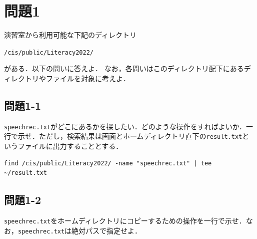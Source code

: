 \documentclass[10pt,dvipdfmx]{jsarticle}
\title{\framebox{\hspace{4zw}2022年度コンピュータリテラシ定期試験%
                 \hspace{4zw}}}
\author{\氏名 \\
        \学籍番号 \\
        愛知県立大学 情報科学部 情報科学科}
\date{2022年8月3日}
\newcommand{\answer}[1]{\begin{flushleft}
            \framebox{\large\bf #1}\end{flushleft}}
\newcommand{\氏名}{神野　友哉}  %
\newcommand{\学籍番号}{2022311042}  %
\begin{document}
\maketitle
%
%
%
%
%
\section*{問題1}

演習室から利用可能な下記のディレクトリ
\begin{center}
\texttt{/cis/public/Literacy2022/}
\end{center}
がある．以下の問いに答えよ．
なお，各問いはこのディレクトリ配下にあるディレクトリやファイルを対象に考えよ．




%
%
\subsection*{問題1-1}
\texttt{speechrec.txt}がどこにあるかを探したい．どのような操作をすればよいか．一行で示せ．ただし，検索結果は画面とホームディレクトリ直下の\texttt{result.txt}というファイルに出力することとする．


\answer{解答1-1}
\begin{verbatim}
find /cis/public/Literacy2022/ -name "speechrec.txt" | tee ~/result.txt
\end{verbatim}

%
%
\subsection*{問題1-2}
\texttt{speechrec.txt}をホームディレクトリにコピーするための操作を一行で示せ．なお，\texttt{speechrec.txt}は絶対パスで指定せよ．
\end{document}
